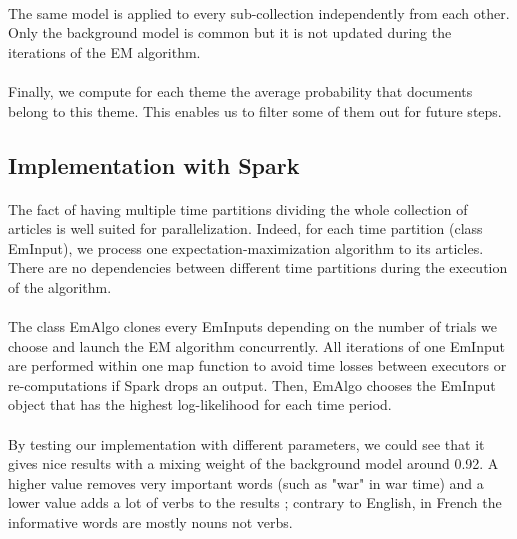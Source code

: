\paragraph{}
The same model is applied to every sub-collection independently from each other. Only the background model is common but it is not updated during the iterations of the EM algorithm. 

\paragraph{}
Finally, we compute for each theme the average probability that documents belong to this theme. This enables us to filter some of them out for future steps.

\subsection{Implementation with Spark}

\paragraph{}
The fact of having multiple time partitions dividing the whole collection of articles is well suited for parallelization. Indeed, for each time partition (class EmInput), we process one expectation-maximization algorithm to its articles. There are no dependencies between different time partitions during the execution of the algorithm.

\paragraph{}
The class EmAlgo clones every EmInputs depending on the number of trials we choose and launch the EM algorithm concurrently. All iterations of one EmInput are performed within one map function to avoid time losses between executors or re-computations if Spark drops an output. Then, EmAlgo chooses the EmInput object that has the highest log-likelihood for each time period.

\paragraph{}
By testing our implementation with different parameters, we could see that it gives nice results with a mixing weight of the background model around 0.92. A higher value removes very important words (such as "war" in war time) and a lower value adds a lot of verbs to the results ; contrary to English, in French the informative words are mostly nouns not verbs.

